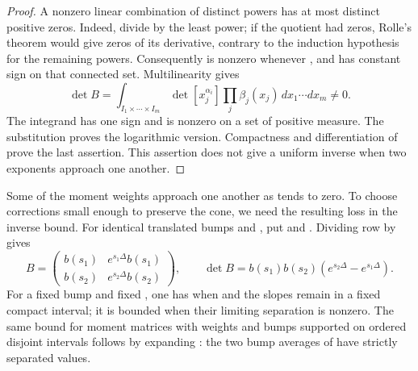 %
\begin{proof}
A nonzero linear combination of  distinct powers has at most
 distinct positive zeros. Indeed, divide by the least power; if the
quotient had  zeros, Rolle's theorem would give
 zeros of its derivative, contrary to the induction hypothesis for the
remaining  powers. Consequently
 is nonzero whenever
, and has constant sign on that connected set.
Multilinearity gives
\[
\det B
=\int_{I_1\times\cdots\times I_m}\det[x_j^{\alpha_i}]
  \prod_j\beta_j(x_j)\,dx_1\cdots dx_m\ne0.
\]
The integrand has one sign and is nonzero on a set of positive measure. The substitution
 proves the logarithmic version. Compactness and differentiation of
 prove the last assertion. This assertion does not give a
uniform inverse when two exponents approach one another.
\end{proof}

Some of the moment weights approach one another as  tends to zero.
To choose corrections small enough to preserve the cone, we need the resulting loss in the inverse
bound. For identical translated bumps  and
, put
 and
. Dividing row
 by  gives
\begin{equation}
B=
\begin{pmatrix}
b(s_1)&e^{s_1\Delta}b(s_1)\\
b(s_2)&e^{s_2\Delta}b(s_2)
\end{pmatrix},
\qquad
\det B=b(s_1)b(s_2)(e^{s_2\Delta}-e^{s_1\Delta}).
\tag{A.1}\label{eq:A.1}
\end{equation}
For a fixed bump and fixed , one has
 when
 and the slopes remain in a fixed compact interval; it is
bounded when their limiting separation is nonzero. The same
 bound for moment matrices with weights
 and bumps supported on ordered disjoint intervals follows by
expanding : the two bump averages
of  have strictly separated values.

